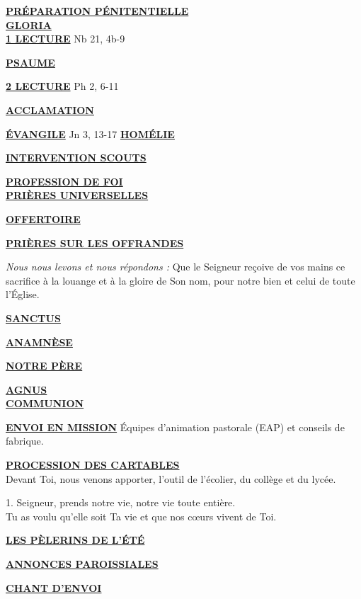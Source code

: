 \documentclass[french,11pt]{article}
\newcommand*{\chants}{../chants}
\newcommand*{\messe}{../messe_grace}
\newcommand*{\pu}{../pu}
\newcommand*{\psaumes}{../psaumes}
\newcommand{\NewsItem}[1]{%
\vspace{3pt}
\underline{\textbf{#1}}
		  }
\begin{document}
\NewsItem{PRÉPARATION PÉNITENTIELLE}\\
	

\NewsItem{GLORIA}\\
	


\NewsItem{1\iere{} LECTURE} Nb 21, 4b-9

\NewsItem{PSAUME}


\NewsItem{2\ieme{} LECTURE} Ph 2, 6-11

\NewsItem{ACCLAMATION}


\NewsItem{ÉVANGILE} Jn 3, 13-17
\hfill
\NewsItem{HOMÉLIE}
\hfill
\NewsItem{INTERVENTION SCOUTS}

\NewsItem{PROFESSION DE FOI}\\



\NewsItem{PRIÈRES UNIVERSELLES}


\NewsItem{OFFERTOIRE}

\NewsItem{PRIÈRES SUR LES OFFRANDES}
\textit{Nous nous levons et nous répondons : }
Que le Seigneur reçoive de vos mains ce sacrifice à la louange et à la gloire
de Son nom, pour notre bien et celui de toute l’Église.

\NewsItem{SANCTUS}


\NewsItem{ANAMNÈSE}


\NewsItem{NOTRE PÈRE}

\NewsItem{AGNUS} \\


\NewsItem{COMMUNION}


\NewsItem{ENVOI EN MISSION} Équipes d'animation pastorale (EAP) et conseils de fabrique.

\NewsItem{PROCESSION DES CARTABLES}\\
Devant Toi, nous venons apporter, l’outil de l’écolier, du collège et du lycée.

1.  Seigneur, prends notre vie, notre vie toute entière. \\
     Tu as voulu qu’elle soit Ta vie et que nos cœurs vivent de Toi. 

\NewsItem{LES PÈLERINS DE L'ÉTÉ}
\hfill
\NewsItem{ANNONCES PAROISSIALES}

\newpage

\NewsItem{CHANT D'ENVOI}

\end{document}
